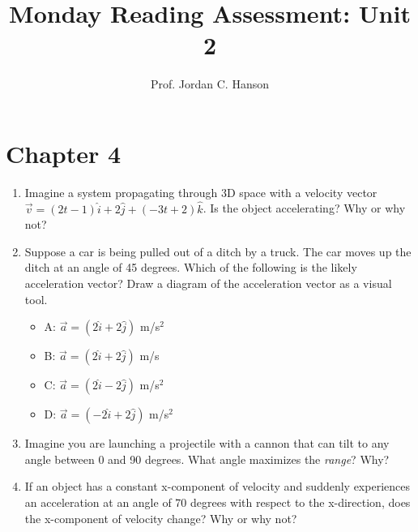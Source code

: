 \documentclass{article}
\begin{document}
\title{Monday Reading Assessment: Unit 2}
\author{Prof. Jordan C. Hanson}

\maketitle

\section{Chapter 4}

\begin{enumerate}
\item Imagine a system propagating through 3D space with a velocity vector $\vec{v} = (2t-1)\hat{i} + 2\hat{j} + (-3t+2)\hat{k}$.  Is the object accelerating?  Why or why not? \\ \vspace{3cm}
\item Suppose a car is being pulled out of a ditch by a truck.  The car moves up the ditch at an angle of 45 degrees.  Which of the following is the likely acceleration vector?  Draw a diagram of the acceleration vector as a visual tool.
\begin{itemize}
\item A: $\vec{a} = (2\hat{i}+2\hat{j})$ m/s$^2$
\item B: $\vec{a} = (2\hat{i}+2\hat{j})$ m/s
\item C: $\vec{a} = (2\hat{i}-2\hat{j})$ m/s$^2$
\item D: $\vec{a} = (-2\hat{i}+2\hat{j})$ m/s$^2$
\end{itemize}
\item Imagine you are launching a projectile with a cannon that can tilt to any angle between 0 and 90 degrees.  What angle maximizes the \textit{range}?  Why? \\ \vspace{3cm}
\item If an object has a constant x-component of velocity and suddenly experiences an acceleration at an angle of 70 degrees with respect to the x-direction, does the x-component of velocity change?  Why or why not?
\end{enumerate}
\end{document}
